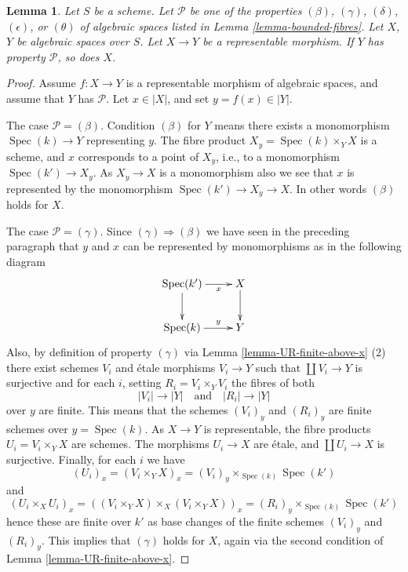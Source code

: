 \documentclass{stacks-project}
\theoremstyle{plain}
\newtheorem{lemma}[subsection]{Lemma}
\theoremstyle{definition}
\theoremstyle{remark}
\numberwithin{equation}{subsection}
\def\Spec{\mathop{\mathrm{Spec}}}
\begin{document}
\begin{lemma}
\label{lemma-representable-properties}
Let $S$ be a scheme. Let $\mathcal{P}$ be one of the properties
$(\beta)$, $(\gamma)$, $(\delta)$, $(\epsilon)$, or
$(\theta)$ of algebraic spaces listed in
Lemma \ref{lemma-bounded-fibres}.
Let $X$, $Y$ be algebraic spaces over $S$.
Let $X \to Y$ be a representable morphism.
If $Y$ has property $\mathcal{P}$, so does $X$.
\end{lemma}

\begin{proof}
Assume $f : X \to Y$ is a representable morphism of algebraic spaces,
and assume that $Y$ has $\mathcal{P}$. Let $x \in |X|$, and set
$y = f(x) \in |Y|$.

\medskip\noindent
The case $\mathcal{P} = (\beta)$. Condition $(\beta)$ for $Y$ means
there exists a monomorphism $\Spec(k) \to Y$ representing $y$.
The fibre product $X_y = \Spec(k) \times_Y X$ is a scheme, and
$x$ corresponds to a point of $X_y$, i.e., to a monomorphism
$\Spec(k') \to X_y$. As $X_y \to X$ is a monomorphism also we see
that $x$ is represented by the monomorphism $\Spec(k') \to X_y \to X$.
In other words $(\beta)$ holds for $X$.

\medskip\noindent
The case $\mathcal{P} = (\gamma)$. Since $(\gamma) \Rightarrow (\beta)$
we have seen in the preceding paragraph that $y$ and $x$ can be represented
by monomorphisms as in the following diagram
$$
\xymatrix{
\Spec(k') \ar[r]_-x \ar[d] & X \ar[d] \\
\Spec(k) \ar[r]^-y & Y
}
$$
Also, by definition of property $(\gamma)$ via
Lemma \ref{lemma-UR-finite-above-x} (2)
there exist schemes
$V_i$ and \'etale morphisms $V_i \to Y$ such that $\coprod V_i \to Y$
is surjective and for each $i$, setting $R_i = V_i \times_Y V_i$
the fibres of both
$$
|V_i| \longrightarrow |Y|
\quad\text{and}\quad
|R_i| \longrightarrow |Y|
$$
over $y$ are finite. This means that the schemes
$(V_i)_y$ and $(R_i)_y$ are finite schemes over $y = \Spec(k)$.
As $X \to Y$ is representable, the fibre products $U_i = V_i \times_Y X$
are schemes. The morphisms $U_i \to X$ are \'etale, and
$\coprod U_i \to X$ is surjective. Finally, for each $i$ we have
$$
(U_i)_x =
(V_i \times_Y X)_x =
(V_i)_y \times_{\Spec(k)} \Spec(k')
$$
and
$$
(U_i \times_X U_i)_x =
\left((V_i \times_Y X) \times_X (V_i \times_Y X)\right)_x =
(R_i)_y \times_{\Spec(k)} \Spec(k')
$$
hence these are finite over $k'$ as base changes of the finite
schemes $(V_i)_y$ and $(R_i)_y$. This implies that $(\gamma)$ holds for $X$,
again via the second condition of
Lemma \ref{lemma-UR-finite-above-x}.


\end{proof}
\end{document}

